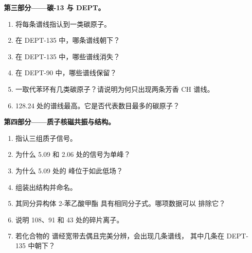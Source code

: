 \begin{problem}
\medskip
\noindent\textbf{第三部分——碳-13 与 DEPT。}
\begin{enumerate}[resume]
  \item 将每条谱线指认到一类碳原子。
  \item 在 DEPT-135 中，哪条谱线朝下？
  \item 在 DEPT-135 中，哪些谱线消失？
  \item 在 DEPT-90 中，哪些谱线保留？
  \item 一取代苯环有几类碳原子？请说明为何只出现两条芳香
        CH 谱线。
  \item 128.24 处的谱线最高。它是否代表数目最多的碳原子？
\end{enumerate}

\medskip
\noindent\textbf{第四部分——质子核磁共振与结构。}
\begin{enumerate}[resume]
  \item 指认三组质子信号。
  \item 为什么 5.09 和 2.06 处的信号为单峰？
  \item 为什么 5.09 处的  峰位于如此低场？
  \item 组装出结构并命名。
  \item 其同分异构体 2-苯乙酸甲酯  具有相同分子式。哪项数据可以
        排除它？
  \item 说明 108、91 和 43 处的碎片离子。
  \item 若化合物的  谱经宽带去偶且完美分辨，会出现几条谱线，
        其中几条在 DEPT-135 中朝下？
\end{enumerate}
\end{problem}
